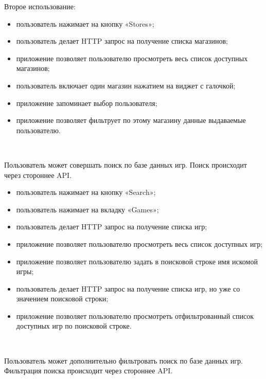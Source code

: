 Второе использование:

\begin{itemize}
  \item пользователь нажимает на кнопку «Stores»;
  \item пользователь делает HTTP запрос на получение списка магазинов;
  \item приложение позволяет пользователю просмотреть весь список доступных магазинов;
  \item пользователь включает один магазин нажатием на виджет с галочкой;
  \item приложение запоминает выбор пользователя;
  \item приложение позволяет фильтрует по этому магазину данные выдаваемые пользователю.
\end{itemize}

~\par

Пользователь может совершать поиск по базе данных игр. Поиск происходит через стороннее API.

\begin{itemize}
  \item пользователь нажимает на кнопку «Search»;
  \item пользователь нажимает на вкладку «Games»;
  \item пользователь делает HTTP запрос на получение списка игр;
  \item приложение позволяет пользователю просмотреть весь список доступных игр;
  \item приложение позволяет пользователю задать в поисковой строке имя искомой игры;
  \item пользователь делает HTTP запрос на получение списка игр, но уже со значением поисковой строки;
  \item приложение позволяет пользователю просмотреть отфильтрованный список доступных игр по поисковой строке.
\end{itemize}

~\par

Пользователь может дополнительно фильтровать поиск по базе данных игр. Фильтрация поиска происходит через стороннее API.


